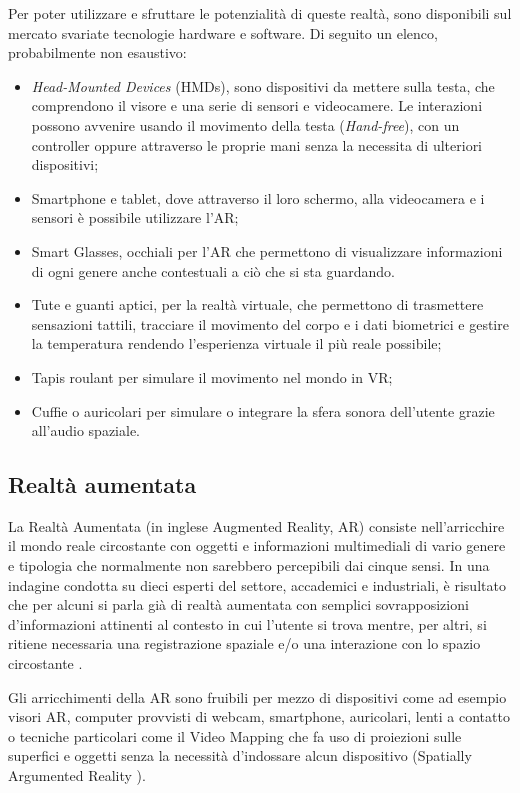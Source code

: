 Per poter utilizzare e sfruttare le potenzialità di queste realtà, sono disponibili sul mercato svariate tecnologie hardware e software. Di seguito un elenco, probabilmente non esaustivo:

\begin{itemize}
    \itemsep0.5em
    \item \textit{Head-Mounted Devices} (HMDs), sono dispositivi da mettere sulla testa, che comprendono il visore e una serie di sensori e videocamere. Le interazioni possono avvenire usando il movimento della testa (\textit{Hand-free}), con un controller oppure  attraverso le proprie mani senza la necessita di ulteriori dispositivi;
    \item Smartphone e tablet, dove attraverso il loro schermo, alla videocamera e i sensori è possibile utilizzare l'AR;
    \item Smart Glasses, occhiali per l'AR che permettono di visualizzare informazioni di ogni genere anche contestuali a ciò che si sta guardando.
    \item Tute e guanti aptici, per la realtà virtuale, che permettono di trasmettere sensazioni tattili, tracciare il movimento del corpo e i dati biometrici e gestire la temperatura rendendo l'esperienza virtuale il più reale possibile;
    \item Tapis roulant per simulare il movimento nel mondo in VR;
    \item Cuffie o auricolari per simulare o integrare la sfera sonora dell'utente grazie all'audio spaziale.
\end{itemize}

\subsection{Realtà aumentata}
\label{sec:ar}
La Realtà Aumentata (in inglese Augmented Reality, AR) consiste nell'arricchire il mondo reale circostante con oggetti e informazioni multimediali di vario genere e tipologia che normalmente non sarebbero percepibili dai cinque sensi.
In una indagine condotta su dieci esperti del settore, accademici e industriali, è risultato che per alcuni si parla già di realtà aumentata con semplici sovrapposizioni d'informazioni attinenti al contesto in cui l'utente si trova mentre, per altri, si ritiene necessaria una registrazione spaziale e/o una interazione con lo spazio circostante \cite[ Capitolo 4, What is AR?]{whatMR}.

Gli arricchimenti della AR sono fruibili per mezzo di dispositivi come ad esempio visori AR, computer provvisti di webcam, smartphone, auricolari, lenti a contatto o tecniche particolari come il Video Mapping che fa uso di proiezioni sulle superfici e oggetti senza la necessità d'indossare alcun dispositivo (Spatially Argumented Reality \cite{Raskar1999SpatiallyAR}).

